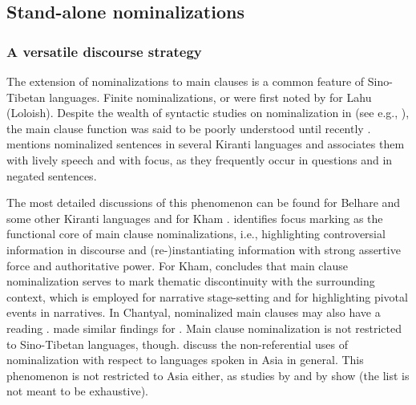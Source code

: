 \subsection{Stand-alone nominalizations}\label{nmlz-uni-3}
\subsubsection{A versatile discourse strategy}

The extension of nominalizations to main clauses is a common feature of Sino-Tibetan languages. Finite nominalizations, or  were first noted by \citet{Matisoff1972Lahu} for Lahu (Loloish). Despite the wealth of syntactic studies on nominalization in  (see e.g., \citealt{Matisoff1972Lahu, Noonan1997Versatile, Noonan2008_Nominalization, DeLancey1999Relativization, DeLancey2002_Relativization, Genetti1992Semantic, Doornenbal2008_Nominalization, Genettietal2008_Nominalization, Watters2008_Nominalization, DeLancey2011_Finite}), the main clause function was said to be poorly understood until recently \citep[101]{Genettietal2008_Nominalization}. \citet[110]{Ebert1994The-structure} mentions nominalized sentences in several Kiranti languages and associates them with lively speech and with  focus, as they frequently occur  in questions and in negated sentences.

 The most detailed discussions of this phenomenon can be found for Belhare and some other Kiranti languages \citep{Bickel1999Nominalization} and for Kham \citep{Watters2002A-grammar}. \citet{Bickel1999Nominalization} identifies focus marking as the functional core of main clause nominalizations, i.e., highlighting controversial information in discourse and (re-)instantiating information with strong assertive force and authoritative power. For Kham, \citet[369]{Watters2002A-grammar} concludes that main clause nominalization serves to mark thematic discontinuity with the surrounding context, which is employed for narrative stage-setting and for highlighting pivotal events in narratives.  In Chantyal, nominalized main clauses may also have a  reading \citep{Noonan2008_Nominalization}. \citet[89]{Doornenbal2008_Nominalization} made similar findings for . Main clause nominalization is not restricted to Sino-Tibetan languages, though. \citet{Yapetal2010_Non-referential} discuss the non-referential uses of nominalization with respect to languages spoken in Asia in general. This phenomenon is not restricted to Asia either, as studies by \citet{Woodbury1985Noun} and by \citet{Wegener2012_Savosavo} show (the list is not meant to be exhaustive). 
 
